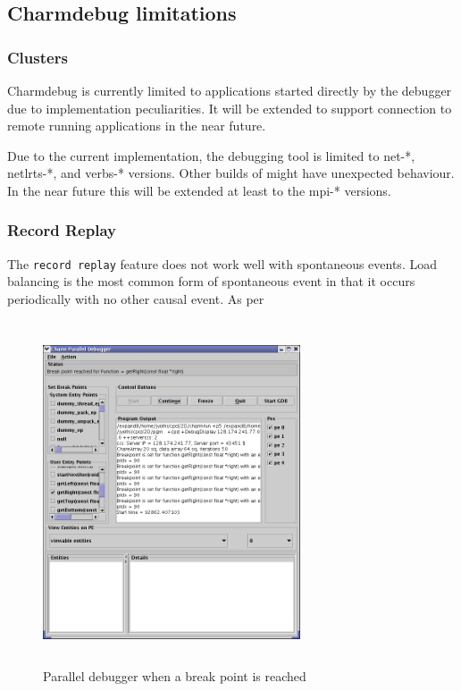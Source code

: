 \documentclass[10pt]{article}
\begin{document}
\subsection{Charmdebug limitations}

\subsubsection{Clusters}

Charmdebug is currently limited to applications started directly by the debugger
due to implementation peculiarities. It will be extended to support connection
to remote running applications in the near future. 

Due to the current implementation, the debugging tool is limited to net-*, netlrts-*, and verbs-*
versions. Other builds of \charmpp{} might have unexpected behaviour. In the near
future this will be extended at least to the mpi-* versions.

\subsubsection{Record Replay}
The \texttt{record replay} feature does not work well with spontaneous
events.  Load balancing is the most common form of spontaneous event
in that it occurs periodically with no other causal event. As per

\begin{figure}[]
\includegraphics[scale=0.5,height=4in, width=3in]{figs/snapshot3}
\caption{Parallel debugger when a break point is reached}
\label{snapshot3}
\end{figure}
\end{document}
